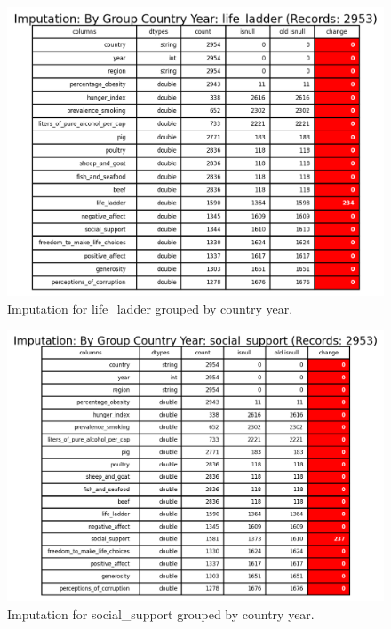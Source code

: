                 \begin{figure}[H]
                        \centering
                        \includegraphics[scale=1]{images/dp_imputation_c_y_life_ladder}
                        \caption{Imputation for life\_ladder grouped by country year.}
                        \label{fig:dp-impute-group-country-life-ladder}
                \end{figure}

                \begin{figure}[H]
                        \centering
                        \includegraphics[scale=1]{images/dp_imputation_c_y_social_support}
                        \caption{Imputation for social\_support grouped by country year.}
                        \label{fig:dp-impute-group-country-social-support}
                \end{figure}

